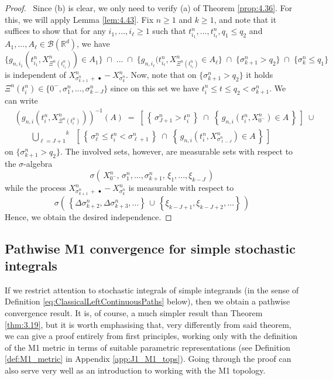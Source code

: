 \documentclass[11pt]{article}
\theoremstyle{definition}\newtheorem{example}[theorem]{Example}
\theoremstyle{definition}\newtheorem{counterexample}[theorem]{Counterexample}
\theoremstyle{definition}\newtheorem{remark}[theorem]{Remark}
\theoremstyle{definition}\newtheorem{defi}[theorem]{Definition}
\numberwithin{equation}{section}
\newcommand{\R}{\mathbb{R}}
\newcommand{\B}{\mathscr{B}}
\newcommand{\union}[2]{\overset{#2}{\bigcup\limits_{#1}}\;}					%
\renewcommand{\|}{\; : \, \;}											%
\begin{document}
\begin{proof} \ Since (b) is clear, we only need to verify (a) of Theorem \ref{prop:4.36}. For this, we will apply Lemma \ref{lem:4.43}. Fix $n\ge 1$ and $k\ge 1$, and note that it suffices to show that for any $i_1,...,i_\ell \ge 1$ such that $t^n_{i_1},...,t^n_{i_\ell},q_1\le q_2$ and $A_1,...,A_\ell \in \B(\R^d)$, we have 
	$$ \{ g_{n,i_1}(t^n_{i_1},X^n_{\Xi^n(t^n_{i_1})}) \in A_1\} \; \cap \; ... \; \cap \; \{ g_{n,i_\ell }(t^n_{i_\ell},X^n_{\Xi^n(t^n_{i_\ell})} \in A_\ell\} \; \cap \; \{\sigma^n_{k+1}>q_2\} \; \cap \; \{\sigma^n_k\le q_1\} $$
	is independent of  $X^n_{\sigma^n_{k+1} \, + \, \bullet} - X^n_{\sigma^n_k}$. Now, note that on $\{\sigma^n_{k+1}>q_2\}$ it holds $\Xi^n(t_i^n)\in \{0^-, \sigma^n_1,..., \sigma^n_{k-J}\}$ since on this set we have $t_i^n \le t \le q_2 < \sigma^n_{k+1}$. We can write
	\begin{align*}
		& \left(g_{n,i}(t^n_i, X^n_{ \Xi^n(t^n_i)}) \right)^{-1}(A) \; = \; \left[\, \left\{ \, \sigma_{J+1}^n  > t^n_i  \, \right\} \; \cap \; \left\{ \, g_{n,i}(t^n_i, X^n_{0^{-}}) \in A \, \right\}\, \right] \; \cup \\ &\qquad \union{\ell=J+1}{k} \; \left[ \, \left\{ \, \sigma_\ell^n \le t^n_i < \sigma_{\ell+1}^n \, \right\} \; \cap \; \left\{ \, g_{n,i}(t^n_i, X^n_{\sigma^n_{\ell-J}}) \in A \, \right\} \, \right]  
	\end{align*}
	on $\{\sigma^n_{k+1}>q_2\}$. The involved sets, however, are measurable sets with respect to the $\sigma$-algebra
	$$ \sigma \left( \, X^n_{0^{-}},\, \sigma^n_1,...,\sigma^n_{k+1}, \, \xi_{1},..., \xi_{k-J}\, \right)$$
	while the process $X^n_{\sigma^n_{k+1} \, + \, \bullet} - X^n_{\sigma^n_k}$ is measurable with respect to 
	$$ \sigma \left( \, \left\{ \Delta \sigma^n_{k+2},\Delta \sigma^n_{k+3}, ...\right\} \, \cup \, \left\{\xi_{k-J+1},\xi_{k-J+2},... \right\} \, \right)$$
	Hence, we obtain the desired independence.
\end{proof}


\subsection{Pathwise M1 convergence for simple stochastic integrals}\label{sect:simple_integrals_M1}


If we restrict attention to stochastic integrals of simple integrands (in the sense of Definition \ref{eq:ClassicalLeftContinuousPaths} below), then we obtain a pathwise convergence result. It is, of course, a much simpler result than Theorem \ref{thm:3.19}, but it is worth emphasising that, very differently from said theorem, we can give a proof entirely from first principles,  working only with the definition of the M1 metric in terms of suitable parametric representations (see Definition \ref{def:M1_metric} in Appendix \ref{app:J1_M1_tops}). Going through the proof can also serve very well as an introduction to working with the M1 topology.
\end{document}
